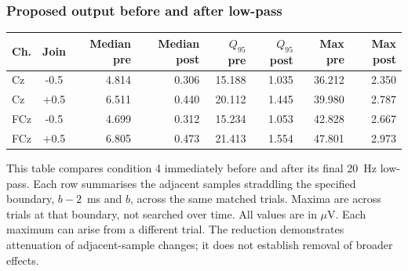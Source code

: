 \documentclass[11pt,a4paper]{article}
\newcommand{\uv}{\ensuremath{\mu\mathrm{V}}}
\begin{document}
\clearpage\subsubsection{Proposed output before and after low-pass}
\begin{center}\small\begin{tabular}{lcrrrrrr}\toprule
Ch. & Join & Median pre & Median post & $Q_{95}$ pre & $Q_{95}$ post & Max pre & Max post \\
\midrule
Cz & -0.5 & 4.814 & 0.306 & 15.188 & 1.035 & 36.212 & 2.350 \\
Cz & +0.5 & 6.511 & 0.440 & 20.112 & 1.445 & 39.980 & 2.787 \\
FCz & -0.5 & 4.699 & 0.312 & 15.234 & 1.053 & 42.828 & 2.667 \\
FCz & +0.5 & 6.805 & 0.473 & 21.413 & 1.554 & 47.801 & 2.973 \\
\bottomrule\end{tabular}\end{center}
This table compares condition 4 immediately before and after its final 20~Hz low-pass. Each row summarises the adjacent samples straddling the specified boundary, $b-2$~ms and $b$, across the same matched trials. Maxima are across trials at that boundary, not searched over time. All values are in \uv. Each maximum can arise from a different trial. The reduction demonstrates attenuation of adjacent-sample changes; it does not establish removal of broader effects.
\end{document}

